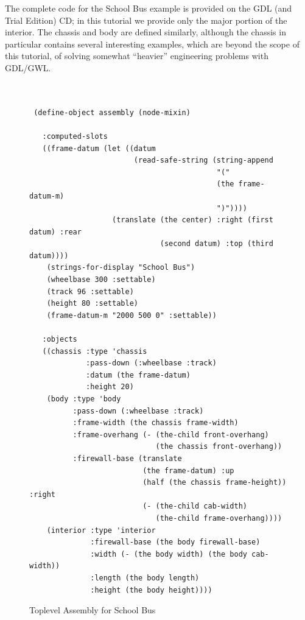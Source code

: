 \documentclass [11pt]{book}
\begin{document}
The complete code for the School Bus example is provided on the GDL (and Trial Edition) CD;
in this tutorial we provide only the major portion of the interior. The chassis and body are 
defined similarly, although the chassis in particular contains several interesting examples,
which are beyond the scope of this tutorial, of solving somewhat ``heavier'' engineering 
problems with GDL/GWL.
\begin{figure}
\begin{lrbox}{\boxedverb}
\begin{minipage}{\linewidth}

\begin{verbatim}


 (define-object assembly (node-mixin)

   :computed-slots
   ((frame-datum (let ((datum
                        (read-safe-string (string-append
                                           "("
                                           (the frame-datum-m)
                                           ")"))))
                   (translate (the center) :right (first datum) :rear
                              (second datum) :top (third datum))))
    (strings-for-display "School Bus")
    (wheelbase 300 :settable)
    (track 96 :settable)
    (height 80 :settable)
    (frame-datum-m "2000 500 0" :settable))

   :objects
   ((chassis :type 'chassis
             :pass-down (:wheelbase :track)
             :datum (the frame-datum)
             :height 20)
    (body :type 'body
          :pass-down (:wheelbase :track)
          :frame-width (the chassis frame-width)
          :frame-overhang (- (the-child front-overhang) 
                             (the chassis front-overhang))
          :firewall-base (translate 
                          (the frame-datum) :up
                          (half (the chassis frame-height)) :right
                          (- (the-child cab-width)
                             (the-child frame-overhang))))
    (interior :type 'interior
              :firewall-base (the body firewall-base)
              :width (- (the body width) (the body cab-width))
              :length (the body length)
              :height (the body height))))

\end{verbatim}
\end{minipage}
\end{lrbox}
\fbox{\usebox{\boxedverb}}

\caption{Toplevel Assembly for School Bus}

\label{code:school-bus}

\end{figure}
\end{document}
